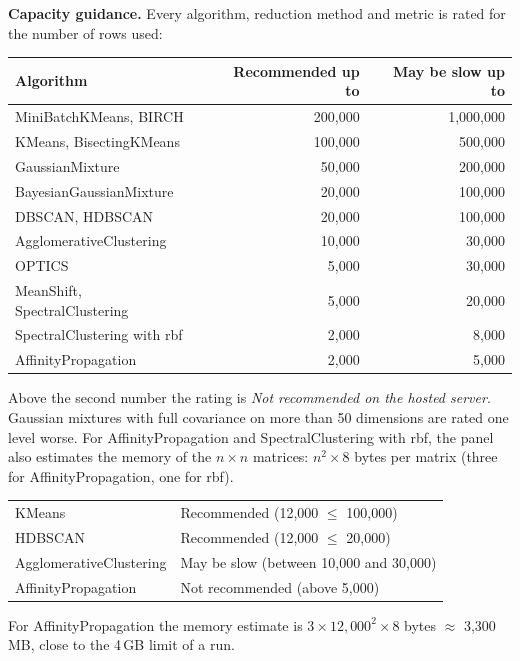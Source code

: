 \documentclass[11pt,a4paper]{article}
\begin{document}
\textbf{Capacity guidance.} Every algorithm, reduction method and metric is rated for the number of rows used:

\begin{center}
\begin{tabular}{lrr}
\toprule
Algorithm & Recommended up to & May be slow up to\\
\midrule
MiniBatchKMeans, BIRCH & 200{,}000 & 1{,}000{,}000\\
KMeans, BisectingKMeans & 100{,}000 & 500{,}000\\
GaussianMixture & 50{,}000 & 200{,}000\\
BayesianGaussianMixture & 20{,}000 & 100{,}000\\
DBSCAN, HDBSCAN & 20{,}000 & 100{,}000\\
AgglomerativeClustering & 10{,}000 & 30{,}000\\
OPTICS & 5{,}000 & 30{,}000\\
MeanShift, SpectralClustering & 5{,}000 & 20{,}000\\
SpectralClustering with rbf & 2{,}000 & 8{,}000\\
AffinityPropagation & 2{,}000 & 5{,}000\\
\bottomrule
\end{tabular}
\end{center}

Above the second number the rating is \emph{Not recommended on the hosted server}. Gaussian mixtures with full
covariance on more than 50 dimensions are rated one level worse. For AffinityPropagation and SpectralClustering with
rbf, the panel also estimates the memory of the $n\times n$ matrices: $n^2\times 8$ bytes per matrix (three for
AffinityPropagation, one for rbf).

\begin{example}
\begin{center}
\begin{tabular}{ll}
\toprule
KMeans & Recommended (12{,}000 $\le$ 100{,}000)\\
HDBSCAN & Recommended (12{,}000 $\le$ 20{,}000)\\
AgglomerativeClustering & May be slow (between 10{,}000 and 30{,}000)\\
AffinityPropagation & Not recommended (above 5{,}000)\\
\bottomrule
\end{tabular}
\end{center}

For AffinityPropagation the memory estimate is $3\times12{,}000^2\times8$ bytes $\approx$ 3{,}300\,MB, close to the
4\,GB limit of a run.
\end{example}
\end{document}
